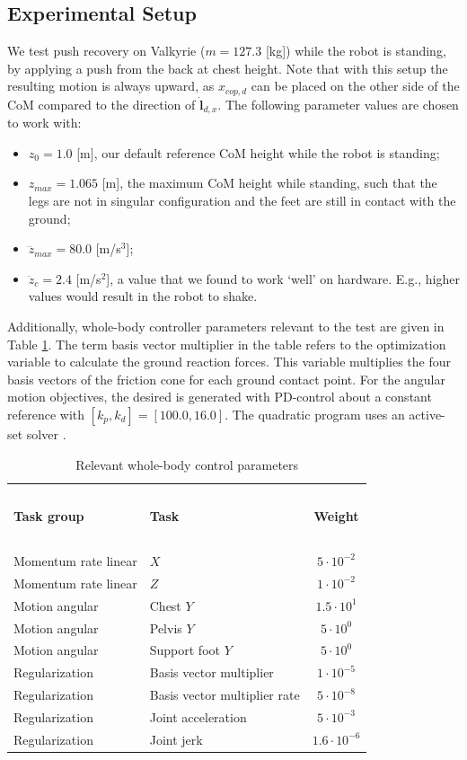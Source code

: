 \documentclass[letterpaper, 10 pt, conference]{ieeeconf}  %
\newcommand{\zmax}{z_{max}}
\newcommand{\rcmpd}{x_{cop,d}}
\begin{document}
\subsection{Experimental Setup}
We test push recovery on Valkyrie ($m=127.3$ [kg]) while the robot is standing, by applying a push from the back at chest height. Note that with this setup the resulting motion is always upward, as $\rcmpd$ can be placed on the other side of the CoM compared to the direction of $\dot{\mathbf{l}}_{d,x}$. The following parameter values are chosen to work with:
\begin{itemize}
\item $z_0=1.0$ [m], our default reference CoM height while the robot is standing;
\item $\zmax=1.065$ [m], the maximum CoM height while standing, such that the legs are not in singular configuration and the feet are still in contact with the ground;
\item $\dddot{z}_{max} = 80.0$ [m/s$^3$];
\item $\ddot{z}_c=2.4$ [m/s$^2$], a value that we found to work `well' on hardware. E.g., higher values would result in the robot to shake. 
\end{itemize}

Additionally, whole-body controller parameters relevant to the test are given in Table \ref{tab:params}. The term basis vector multiplier in the table refers to the optimization variable to calculate the ground reaction forces. This variable multiplies the four basis vectors of the friction cone for each ground contact point. For the angular motion objectives, the desired is generated with PD-control about a constant reference with $[k_p, k_d]=[100.0,16.0]$. The quadratic program uses an active-set solver \cite{kuindersma2014efficiently}.
\begin{table}[h]
\caption{Relevant whole-body control parameters}
\label{tab:params}
\begin{center}
\begin{tabular}{llc}
\hline~\\[-2ex]
\textbf{Task group} & \textbf{Task} & \textbf{Weight}\\
\hline ~\\[-2ex]
Momentum rate linear& $X$ & $5 \cdot 10^{-2}$\\
Momentum rate linear& $Z$ & $1 \cdot 10^{-2}$\\
Motion angular& Chest $Y$ &    $1.5 \cdot 10^1$\\
Motion angular& Pelvis $Y$ &  $5 \cdot 10^0$\\
Motion angular& Support foot $Y$ &  $5 \cdot 10^0$\\
Regularization & Basis vector multiplier&  $1 \cdot 10^{-5}$\\
Regularization & Basis vector multiplier rate & $5 \cdot 10^{-8}$\\
Regularization & Joint acceleration & $5 \cdot 10^{-3}$\\
Regularization & Joint jerk & $1.6 \cdot 10^{-6}$\\
\hline
\end{tabular}
\end{center}
\end{table}
\end{document}
